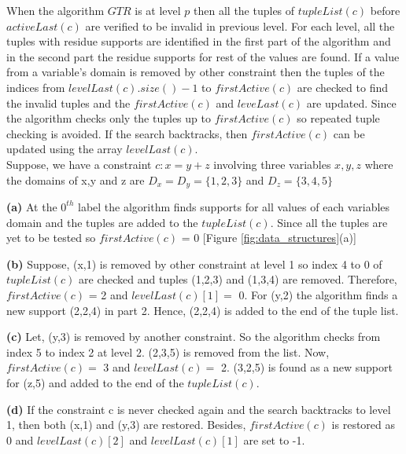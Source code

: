\documentclass[11pt , conference]{IEEEtran}
\begin{document}
\noindent When the algorithm $ GTR $ is at level $ p $ then all the tuples of $ tupleList(c) $ before $ activeLast(c) $  are verified to be invalid in previous level. For each level, all the tuples with residue supports are identified in the first part of the algorithm and in the second part the residue supports for rest of the values are found. If a value from a variable's domain is removed by other constraint then the tuples of the indices from $ levelLast(c).size()-1 $ to $ firstActive(c) $ are checked to find the invalid tuples and the $ firstActive(c) $ and $ leveLast(c) $ are updated. Since the algorithm checks only the tuples up to $firstActive(c)$ so repeated tuple checking is avoided. If the search backtracks, then $ firstActive(c) $ can be updated using the array $ levelLast(c)$.\\
 Suppose, we have a constraint $ c: x = y + z $ involving three variables $ x,y,z $ where the domains of x,y and z are $ D_{x} = D_{y} = \{1,2,3\} $ and $ D_{z} =  \{3,4,5\}$
 
\textbf{(a)} At the $ 0^{th} $ label the algorithm finds supports for all values of each variables domain and the tuples are added to the $ tupleList(c) $. Since all the tuples are yet to be tested so $ firstActive(c) $ = 0 [Figure \ref{fig:data_structures}(a)]

\textbf{(b)} Suppose, (x,1) is removed by other constraint at level 1 so index 4 to 0 of $ tupleList(c) $ are checked and tuples (1,2,3) and (1,3,4) are removed. Therefore, $firstActive(c) $ = 2 and $ levelLast(c)[1] = $ 0. For (y,2) the algorithm finds a new support (2,2,4) in part 2. Hence, (2,2,4) is added to the end of the tuple list.

\textbf{(c)} Let, (y,3) is removed by another constraint. So the algorithm checks from index 5 to index 2 at level 2. (2,3,5) is removed from the list. Now, $ firstActive(c) = $ 3 and $ levelLast(c) = $ 2.   (3,2,5) is found as a new support for (z,5) and added to the end of the $ tupleList(c).$

\textbf{(d)} If the constraint c is never checked again and the search backtracks to level 1, then both (x,1) and (y,3) are restored. Besides, $ firstActive(c) $ is restored as 0 and $ levelLast(c)[2]$ and $levelLast(c)[1] $ are set to -1.
\end{document}
